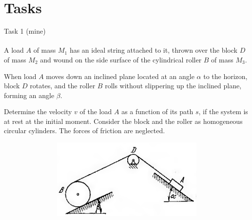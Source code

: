 \documentclass[aspectratio=169]{beamer}
\begin{document}
\section*{Tasks}
\begin{frame}[t]{Task 1 (mine)}
    \framesubtitle{}
    \small
    A load $A$ of mass $M_1$ has an ideal string attached to it, thrown over the block $D$ of mass $M_2$ and wound on the side surface of the cylindrical roller $B$ of mass $M_3$. 
    \begin{minipage}{0.55\textwidth}

    When load $A$ moves down an inclined plane located at an angle $\alpha$ to the horizon, block $D$ rotates, and the roller $B$ rolls without slippering up the inclined plane, forming an angle $ \beta$.
    \medskip
    
    Determine the velocity $v$ of the load $A$ as a function of its path $s$, if the system is at rest at the initial moment. Consider the block and the roller as homogeneous circular cylinders. The forces of friction are neglected.
    \end{minipage}
    \begin{minipage}{0.44\textwidth}
        \begin{figure}[H]
            \centering\includegraphics[height=4cm,width=1\textwidth,keepaspectratio]{lab12_1.png}
        \end{figure}
    \end{minipage}
    \end{frame}
\end{document}
